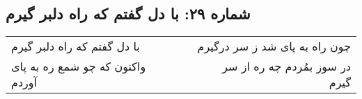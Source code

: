 \begin{center}
\section*{شماره ۲۹: با دل گفتم که راه دلبر گیرم}
\label{sec:029}
\begin{longtable}{l p{0.5cm} r}
با دل گفتم که راه دلبر گیرم
&&
چون راه به پای شد ز سر درگیرم
\\
واکنون که چو شمع ره به پای آوردم
&&
در سوز بمُردم چه ره از سر گیرم
\\
\end{longtable}
\end{center}
